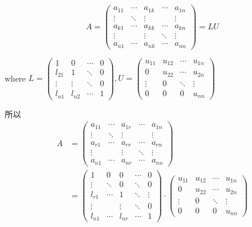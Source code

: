 \begin{definition}[$A$的LU分解]
    \begin{equation} A=\left(\begin{array}{ccccc}a_{11} & \cdots & a_{1 k} & \cdots & a_{1 n} \\ \vdots & \ddots & \vdots & & \vdots \\ a_{k 1} & \cdots & a_{k k} & \cdots & a_{k n} \\ \vdots & & \vdots & \ddots & \vdots \\ a_{n 1} & \cdots & a_{n k} & \cdots & a_{n n}\end{array}\right) =LU \end{equation}

    where $ L=\left(\begin{array}{cccc}1 & 0 & \cdots & 0 \\ l_{21} & 1 & \ddots & 0 \\ \vdots & \vdots & \ddots & 0 \\ l_{n 1} & l_{n 2} & \cdots & 1\end{array}\right) , U=\left(\begin{array}{cccc}u_{11} & u_{12} & \cdots & u_{1 n} \\ 0 & u_{22} & \cdots & u_{2 n} \\ \vdots & 0 & \ddots & \vdots \\ 0 & 0 & 0 & u_{n n}\end{array}\right) $
\end{definition}

所以
\begin{equation}
    \begin{aligned}
        A & =\left(\begin{array}{ccccc}a_{11} & \cdots & a_{1 r} & \cdots & a_{1 n} \\ \vdots & \ddots & \vdots & & \vdots \\ a_{r 1} & \cdots & a_{r r} & \cdots & a_{r n} \\ \vdots & & \vdots & \ddots & \vdots \\ a_{n 1} & \cdots & a_{n r} & \cdots & a_{n n}\end{array}\right)                                               \\
          & =\left(\begin{array}{ccccc}1 & 0 & 0 & \cdots & 0 \\ \vdots & \ddots & 0 & \ddots & 0 \\ l_{r 1} & \cdots & 1 & \ddots & \vdots \\ \vdots & & \vdots & \ddots & 0 \\ l_{n 1} & \cdots & l_{n r} & \cdots & 1\end{array}\right) \cdot \left(\begin{array}{cccc}u_{11} & u_{12} & \cdots & u_{1 n} \\ 0 & u_{22} & \cdots & u_{2 n} \\ \vdots & 0 & \ddots & \vdots \\ 0 & 0 & 0 & u_{n n}\end{array}\right)
    \end{aligned}
\end{equation}

